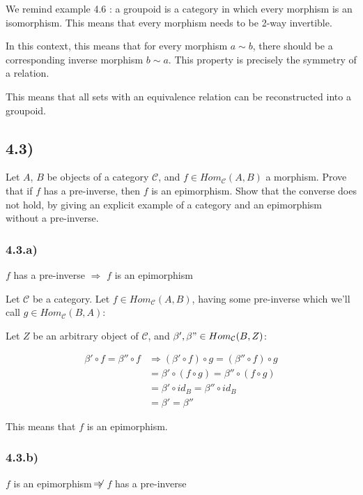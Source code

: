 \documentclass[12pt, letterpaper, twoside]{report}
\newcommand{\notRightarrow}{\;\not\!\!\!\Rightarrow}
\begin{document}
We remind example 4.6 : a groupoid is a category in which every morphism is an isomorphism. This means that every morphism needs to be 2-way invertible.

In this context, this means that for every morphism $a \sim b$, there should be a corresponding inverse morphism $b \sim a$. This property is precisely the symmetry of a relation.

This means that all sets with an equivalence relation can be reconstructed into a groupoid.



\subsection*{4.3)}

Let $A$, $B$ be objects of a category $\mathcal{C}$, and $f \in Hom_{\mathcal{C}} (A, B)$ a morphism. Prove that if $f$ has a pre-inverse, then $f$ is an epimorphism. Show that the converse does not hold, by giving an explicit example of a category and an epimorphism without a pre-inverse.

\subsubsection*{4.3.a)} $f$ has a pre-inverse $\Rightarrow$ $f$ is an epimorphism

Let $\mathcal{C}$ be a category. Let $f \in Hom_{\mathcal{C}} (A, B)$, having some pre-inverse which we'll call $g \in Hom_{\mathcal{C}} (B, A)$:

Let $Z$ be an arbitrary object of $\mathcal{C}$, and $\beta', \beta" \in Hom_{\mathcal{C}} (B, Z)$:

$$
\begin{aligned}
	\beta' \circ f = \beta'' \circ f
		& \Rightarrow (\beta' \circ  f) \circ g  = (\beta'' \circ  f) \circ g  \\
		& =            \beta' \circ (f  \circ g) =  \beta'' \circ (f  \circ g) \\
		& =            \beta' \circ id_B         =  \beta'' \circ id_B \\
		& =            \beta'                    =  \beta''
\end{aligned}
$$

This means that $f$ is an epimorphism.


\subsubsection*{4.3.b)} $f$ is an epimorphism $\notRightarrow$ $f$ has a pre-inverse
\end{document}
